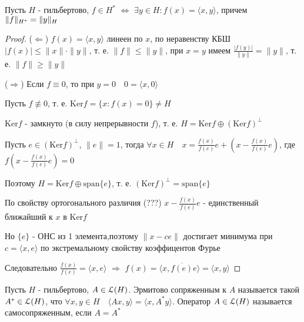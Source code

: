 \documentclass[a4paper,12pt]{report}
\newcommand*{\hm}[1]{#1\nobreak\discretionary{}%
            {\hbox{$\mathsurround=0pt #1$}}{}}
\begin{document}
\begin{thm}
Пусть $H$ - гильбертово, $f\in H^*$ $\Leftrightarrow$ $\exists y\in H\colon f(x)=\langle x,y\rangle$, причем $\|f\|_{H^*}\hm=\|y\|_H$
\end{thm}
\begin{proof}
($\Leftarrow$) $f(x)=\langle x,y\rangle$ линеен по $x$, по неравенству КБШ $|f(x)|\le\|x\|\cdot\|y\|$, т. е. $\|f\|\le\|y\|$, при $x=y$ имеем $\frac{|f(y)|}{\|y\|}=\|y\|$, т. е. $\|f\|\ge\|y\|$

($\Rightarrow$) Если $f\equiv0$, то при $y=0\quad 0=\langle x,0\rangle$

Пусть $f\not\equiv0$, т. е. $\mathrm{Ker} f=\{x\colon f(x)=0\}\ne H$

$\mathrm{Ker}f$ - замкнуто (в силу непрерывности $f$), т. е. $H=\mathrm{Ker}f\oplus(\mathrm{Ker}f)^\perp$

Пусть $e\in(\mathrm{Ker}f)^\perp$, $\|e\|=1$, тогда $\forall x\in H\quad x=\frac{f(x)}{f(e)}e+(x-\frac{f(x)}{f(e)}e)$, где $f(x-\frac{f(x)}{f(e)}e)=0$

Поэтому $H=\mathrm{Ker}f\oplus\mathrm{span}\{e\}$, т. е. $(\mathrm{Ker}f)^\perp=\mathrm{span}\{e\}$

По свойству ортогонального различия (???) $x-\frac{f(x)}{f(e)}e$ - единственный ближайший к $x$ в $\mathrm{Ker}f$

Но $\{e\}$ - ОНС из 1 элемента,поэтому $\|x-ce\|$ достигает минимума при $c=\langle x,e\rangle$ по экстремальному свойству коэффицентов Фурье

Следовательно $\frac{f(x)}{f(e)}=\langle x,e\rangle$ $\Rightarrow$ $f(x)=\langle x,\overline{f(e)}e\rangle=\langle x,y\rangle$
\end{proof}
 


\begin{df}
Пусть $H$ - гильбертово, $A\in\EuScript L(H)$. Эрмитово сопряженным к $A$ называется такой $A^*\in\EuScript L(H)$, что $\forall x,y\in H\quad\langle Ax,y\rangle=\langle x,A^*y\rangle$. Оператор $A\in\EuScript L(H)$ называется самосопряженным, если $A=A^*$
\end{df}
 
\end{document}
